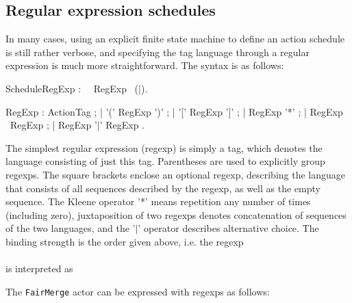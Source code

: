 

\subsection{Regular expression schedules}\label{sect:RegexpSchedules}



In many cases, using an explicit finite state machine to define an
action schedule is still rather verbose, and specifying the tag
language through a regular expression is much more
straightforward. The syntax is as follows:


\bgr
  ScheduleRegExp : \kwSchedule ~\kwRegexp ~RegExp ~(\kwEnd|\kwEndSchedule).

  RegExp : ActionTag ;
      | '(' RegExp ')' ;
      | '[' RegExp ']' ;
      | RegExp '*' ;
      | RegExp ~RegExp ;
      | RegExp '|' RegExp .
\egr


The simplest regular expression (regexp) is simply a tag, which
denotes the language consisting of just this tag. Parentheses are used
to explicitly group regexps. The square brackets enclose an optional
regexp, describing the language that consists of all sequences
described by the regexp, as well as the empty sequence. The Kleene
operator '*' means repetition any number of times (including zero),
juxtaposition of two regexps denotes concatenation of sequences of the
two languages, and the '$\mid$' operator describes alternative choice.
 The binding strength is the order given
above, i.e. the regexp \\
\\
is interpreted as\\

The {\tt FairMerge} actor can be expressed with regexps as follows:

